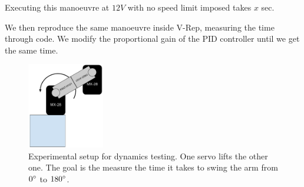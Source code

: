 Executing this manoeuvre at $12V$ with no speed limit imposed takes $x$ sec.

We then reproduce the same manoeuvre inside V-Rep, measuring the time through code. We modify the proportional gain of the PID controller until we get the same time.

\begin{figure}[htp]
\center
    \includegraphics[width = 0.3\textwidth]{figures/exp2}
    \caption[Experimental setup dynamics testing]{Experimental setup for dynamics testing. One servo lifts the other one. The goal is the measure the time it takes to swing the arm from $0\degree$ to $180\degree$.}
    \label{fig:exp2}
\end{figure}